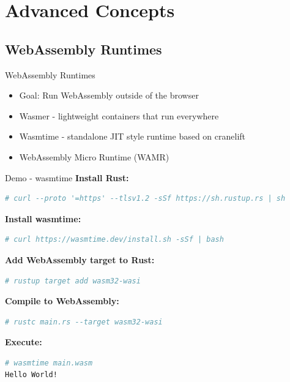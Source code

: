 \documentclass{beamer}
\begin{document}
\section{Advanced Concepts}

\subsection{WebAssembly Runtimes}

\begin{frame}{WebAssembly Runtimes}
    \begin{itemize}
        \item Goal: Run WebAssembly outside of the browser
        \item Wasmer - lightweight containers that run everywhere
        \item Wasmtime - standalone JIT style runtime based on cranelift
        \item WebAssembly Micro Runtime (WAMR)
    \end{itemize}
\end{frame}

\begin{frame}[fragile]{Demo - wasmtime}
    \textbf{Install Rust:}
    \begin{lstlisting}[language=bash,basicstyle=\scriptsize]
# curl --proto '=https' --tlsv1.2 -sSf https://sh.rustup.rs | sh
    \end{lstlisting}

    \textbf{Install wasmtime:}
    \begin{lstlisting}[language=bash,basicstyle=\scriptsize]
# curl https://wasmtime.dev/install.sh -sSf | bash
    \end{lstlisting}

    \textbf{Add WebAssembly target to Rust:}
    \begin{lstlisting}[language=bash,basicstyle=\scriptsize]
# rustup target add wasm32-wasi
    \end{lstlisting}

    \textbf{Compile to WebAssembly:}
    \begin{lstlisting}[language=bash,basicstyle=\scriptsize]
# rustc main.rs --target wasm32-wasi
    \end{lstlisting}

    \textbf{Execute:}
    \begin{lstlisting}[language=bash,basicstyle=\scriptsize]
# wasmtime main.wasm
Hello World!
    \end{lstlisting}
\end{frame}
\end{document}
